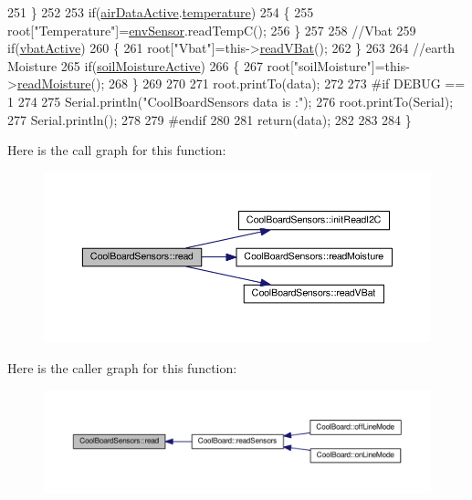 \begin{DoxyCode}
251     \}   
252     
253     \textcolor{keywordflow}{if}(\hyperlink{classCoolBoardSensors_abff8dfeccb2f7689847bb64d5f1cd31e}{airDataActive}.\hyperlink{structCoolBoardSensors_1_1airActive_a9a6633c426b0508e30ebc1832ec6d745}{temperature})
254     \{
255         root[\textcolor{stringliteral}{"Temperature"}]=\hyperlink{classCoolBoardSensors_a868e38985e9a2412829fa2790ca13e2e}{envSensor}.readTempC();
256     \}
257     
258     \textcolor{comment}{//Vbat}
259     \textcolor{keywordflow}{if}(\hyperlink{classCoolBoardSensors_af5039ad760b0ff0aa7eee16c55e81702}{vbatActive})    
260     \{   
261         root[\textcolor{stringliteral}{"Vbat"}]=this->\hyperlink{classCoolBoardSensors_a6944b6ea7bce8e2fce1b434acfd9d5f3}{readVBat}();
262     \}
263     
264     \textcolor{comment}{//earth Moisture}
265     \textcolor{keywordflow}{if}(\hyperlink{classCoolBoardSensors_a31983eecc0f9cd000e1f912206ea4dc8}{soilMoistureActive})
266     \{   
267         root[\textcolor{stringliteral}{"soilMoisture"}]=this->\hyperlink{classCoolBoardSensors_a8761bff50373c485f4465c8db47d0633}{readMoisture}();
268     \}
269     
270     
271     root.printTo(data);
272 
273 \textcolor{preprocessor}{#if DEBUG == 1}
274 
275     Serial.println(\textcolor{stringliteral}{"CoolBoardSensors data is :"});
276     root.printTo(Serial);
277     Serial.println();
278 
279 \textcolor{preprocessor}{#endif}
280 
281     \textcolor{keywordflow}{return}(data);   
282     
283 
284 \}
\end{DoxyCode}
Here is the call graph for this function\+:\nopagebreak
\begin{figure}[H]
\begin{center}
\leavevmode
\includegraphics[width=350pt]{classCoolBoardSensors_a91badb2539d91fda8679f2a597874c48_cgraph}
\end{center}
\end{figure}
Here is the caller graph for this function\+:\nopagebreak
\begin{figure}[H]
\begin{center}
\leavevmode
\includegraphics[width=350pt]{classCoolBoardSensors_a91badb2539d91fda8679f2a597874c48_icgraph}
\end{center}
\end{figure}
